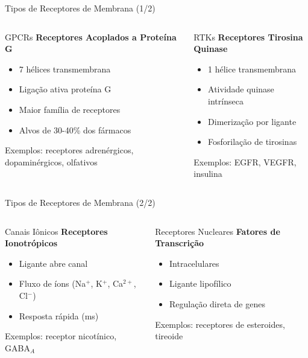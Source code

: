 \begin{frame}[shrink=5]{Tipos de Receptores de Membrana (1/2)}
\begin{columns}
\begin{block}{GPCRs}
\textbf{Receptores Acoplados a Proteína G}
\begin{itemize}
    \item 7 hélices transmembrana
    \item Ligação ativa proteína G
    \item Maior família de receptores
    \item Alvos de 30-40\% dos fármacos
\end{itemize}
Exemplos: receptores adrenérgicos, dopaminérgicos, olfativos
\end{block}

\begin{block}{RTKs}
\textbf{Receptores Tirosina Quinase}
\begin{itemize}
    \item 1 hélice transmembrana
    \item Atividade quinase intrínseca
    \item Dimerização por ligante
    \item Fosforilação de tirosinas
\end{itemize}
Exemplos: EGFR, VEGFR, insulina
\end{block}
\end{columns}
\end{frame}

\begin{frame}[shrink=5]{Tipos de Receptores de Membrana (2/2)}
\begin{columns}
\begin{block}{Canais Iônicos}
\textbf{Receptores Ionotrópicos}
\begin{itemize}
    \item Ligante abre canal
    \item Fluxo de íons (Na$^+$, K$^+$, Ca$^{2+}$, Cl$^-$)
    \item Resposta rápida (ms)
\end{itemize}
Exemplos: receptor nicotínico, GABA$_A$
\end{block}

\begin{block}{Receptores Nucleares}
\textbf{Fatores de Transcrição}
\begin{itemize}
    \item Intracelulares
    \item Ligante lipofílico
    \item Regulação direta de genes
\end{itemize}
Exemplos: receptores de esteroides, tireoide
\end{block}
\end{columns}
\end{frame}

